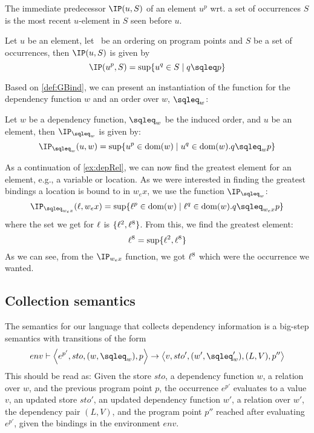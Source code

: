 \documentclass{eptcs}
\begin{document}
%
The immediate predecessor $\IP(u,S)$ of an element $u^p$ wrt. a set of
occurrences $S$ is the most recent $u$-element in $S$ seen before $u$. 

\begin{definition}\label{def:GBind}
  Let $u$ be an element, let \sqleq\ be an ordering on program points
  and $S$ be a set of occurrences, then $\IP(u,S)$ is given by
\[ \IP(u^p,S)=\sup\{u^q\in S\mid q\sqleq p\} \]
\end{definition}

Based on \cref{def:GBind}, we can present an instantiation of the
function for the dependency function $w$ and an order over $w$,
$\sqleq_w$: 

\begin{definition}
  Let $w$ be a dependency function, $\sqleq_w$ be the induced order,
  and $u$ be an element, then $\IP_{\sqleq_w}$ is given by:
	$$\IP_{\sqleq_w}(u,w)=\sup\{u^p\in \dom(w)\mid u^q\in \dom(w).q\sqleq_w p\}$$
\end{definition}


\begin{example}\label{ex:deplookup}
  As a continuation of \cref{ex:depRel}, we can now find the greatest
  element for an element, e.g., a variable or location.  As we were
  interested in finding the greatest bindings a location is bound to
  in $w_ex$, we use the function $\IP_{\sqleq_w}$:
	\[ \IP_{\sqleq_{w_ex}}(\loc,w_ex)=\sup\{\loc^p\in \dom(w)\mid
          \loc^q\in \dom(w). q\sqleq_{w_ex} p\} \]
where the set we get for $\ell$ is 
$\{\ell^2,\ell^8\}$. From this, we find the greatest element: 
	\[ \ell^8=\sup\{\ell^2,\ell^8\} \]
	As we can see, from the $\IP_{w_ex}$ function, we got $\ell^8$ which were the occurrence we wanted.
\end{example}

\subsection{Collection semantics}\label{sec:sem}

The semantics for our language that collects dependency information is
a big-step semantics with transitions of the form
%
\begin{align*}
env\vdash\left\langle e^{p'},sto,(w,\sqleq_w),p\right\rangle\rightarrow\left\langle v,sto',(w',\sqleq_w'),(L,V),p''\right\rangle
\end{align*}
%
This should be read as: Given the store $sto$, a dependency function
$w$, a relation over $w$, and the previous program point $p$, the
occurrence $e^{p'}$ evaluates to a value $v$, an updated store $sto'$,
an updated dependency function $w'$, a relation over $w'$, the
dependency pair $(L,V)$, and the program point $p''$ reached after
evaluating $e^{p'}$, given the bindings in the environment $env$. 
\end{document}
